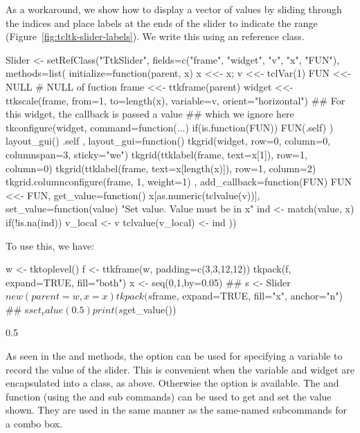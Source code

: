 As a workaround, we show how to display a vector of values by sliding
through the indices and place labels at the ends of the slider to
indicate the range (Figure~\ref{fig:tcltk-slider-labels}). We write
this using an \R{} reference class.

\begin{Schunk}
\begin{Sinput}
 Slider <-
   setRefClass("TtkSlider",
      fields=c("frame", "widget", "v", "x", "FUN"),
      methods=list(
        initialize=function(parent, x) {
          x <<- x;  v <<- tclVar(1)
          FUN <<- NULL                   # NULL of fuction
          frame <<- ttkframe(parent)
          widget <<- ttkscale(frame, from=1, to=length(x),
                              variable=v, orient="horizontal")
          ## For this widget, the callback is passed a value 
          ## which we ignore here
          tkconfigure(widget, command=function(...) {
            if(is.function(FUN)) FUN(.self)
          })
          layout_gui()
          .self
        },
        layout_gui=function() {         
          tkgrid(widget, row=0, column=0, columnspan=3, 
                 sticky="we")
          tkgrid(ttklabel(frame, text=x[1]), 
                 row=1, column=0)
          tkgrid(ttklabel(frame, text=x[length(x)]), 
                 row=1, column=2)
          tkgrid.columnconfigure(frame, 1, weight=1)
        },
        add_callback=function(FUN) FUN <<- FUN,
        get_value=function() x[as.numeric(tclvalue(v))],
        set_value=function(value) {
          "Set value. Value must be in x"
          ind <- match(value, x)
          if(!is.na(ind)) {
            v_local <- v
            tclvalue(v_local) <- ind
          }
        }
        ))
\end{Sinput}
\end{Schunk}

To use this, we have:
\begin{Schunk}
\begin{Sinput}
 w <- tktoplevel()
 f <- ttkframe(w, padding=c(3,3,12,12))
 tkpack(f, expand=TRUE, fill="both")
 x <- seq(0,1,by=0.05)
 ##
 s <- Slider$new(parent=w, x=x)
 tkpack(s$frame, expand=TRUE, fill="x", anchor="n")
 ##
 s$set_value(0.5)
 print(s$get_value())
\end{Sinput}
\begin{Soutput}
[1] 0.5
\end{Soutput}
\end{Schunk}

As seen in the  and  methods, the
 option can be used for specifying a \TCL\/
variable to record the value of the slider. This is convenient when
the variable and widget are encapsulated into a class, as
above. Otherwise the  option is available.
The  and  function (using the
 and  sub
commands) can be used to get and set the value shown. They are used in
the same manner as the same-named subcommands for a combo box.

